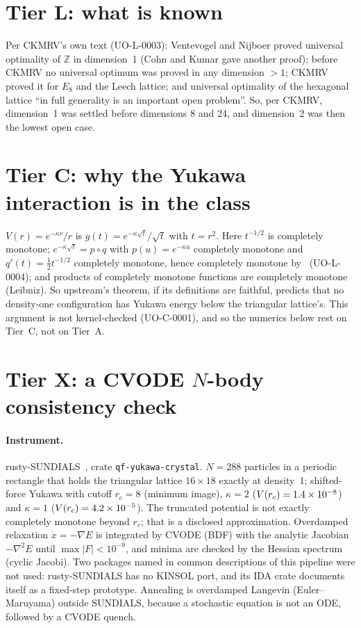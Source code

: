 \documentclass[11pt]{article}
\begin{document}
\section{Tier L: what is known}
Per CKMRV's own text (UO-L-0003): Ventevogel and Nijboer proved universal optimality of $\mathbb Z$ in dimension~1
(Cohn and Kumar gave another proof); before CKMRV no universal optimum was proved in any dimension $>1$; CKMRV proved
it for $E_8$ and the Leech lattice; and universal optimality of the hexagonal lattice ``in full generality is an
important open problem''. So, per CKMRV, dimension~1 was settled before dimensions 8 and 24, and dimension~2 was
then the lowest open case.

\section{Tier C: why the Yukawa interaction is in the class}
$V(r)=e^{-\kappa r}/r$ is $g(t)=e^{-\kappa\sqrt t}/\sqrt t$ with $t=r^2$. Here $t^{-1/2}$ is completely monotone;
$e^{-\kappa\sqrt t}=p\circ q$ with $p(u)=e^{-\kappa u}$ completely monotone and $q'(t)=\tfrac12t^{-1/2}$ completely
monotone, hence completely monotone by~\cite[footnote~2]{ckmrv} (UO-L-0004); and products of completely monotone
functions are completely monotone (Leibniz). So upstream's theorem, if its definitions are faithful, predicts that no
density-one configuration has Yukawa energy below the triangular lattice's. This argument is not kernel-checked
(UO-C-0001), and so the numerics below rest on Tier~C, not on Tier~A.

\section{Tier X: a CVODE $N$-body consistency check}

\paragraph{Instrument.} rusty-SUNDIALS~\cite{rusty}, crate \texttt{qf-yukawa-crystal}. $N=288$ particles in a periodic
rectangle that holds the triangular lattice $16\times18$ exactly at density~1; shifted-force Yukawa with cutoff
$r_c=8$ (minimum image), $\kappa=2$ ($V(r_c)=1.4\times10^{-8}$) and $\kappa=1$ ($V(r_c)=4.2\times10^{-5}$). The truncated
potential is not exactly completely monotone beyond $r_c$; that is a disclosed approximation. Overdamped relaxation
$\dot x=-\nabla E$ is integrated by CVODE (BDF) with the analytic Jacobian $-\nabla^2E$ until $\max|F|<10^{-9}$, and
minima are checked by the Hessian spectrum (cyclic Jacobi). Two packages named in common descriptions of this pipeline
were not used: rusty-SUNDIALS has no KINSOL port, and its IDA crate documents itself as a fixed-step prototype.
Annealing is overdamped Langevin (Euler--Maruyama) outside SUNDIALS, because a stochastic equation is not an ODE,
followed by a CVODE quench.
\end{document}

